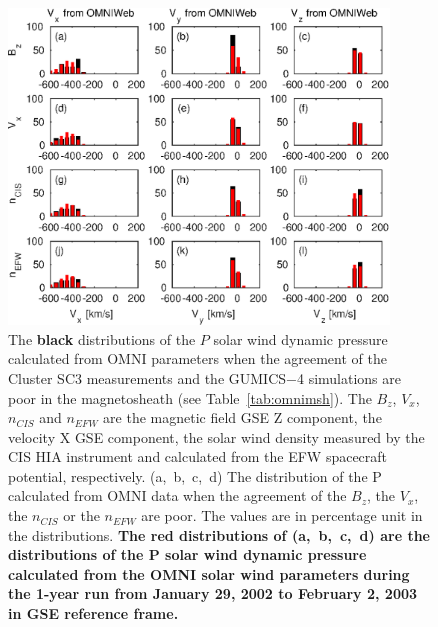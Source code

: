 \documentclass[linenumbers,draft]{agujournal}
\begin{document}
\begin{figure}[h]
\centering
\includegraphics[width=0.9\textwidth,angle=0]{swe-2021-corr-f18}
\caption{The \textbf{black} distributions of the $P$ solar wind dynamic pressure calculated from OMNI parameters when the agreement of the Cluster SC3 measurements and the GUMICS$-$4 simulations are poor in the magnetosheath (see Table~\ref{tab:omnimsh}). The $B_{z}$, $V_{x}$, $n_{CIS}$ and $n_{EFW}$ are the magnetic field GSE Z component, the velocity X GSE component, the solar wind density measured by the CIS HIA instrument and calculated from the EFW spacecraft potential, respectively. (a,~b,~c,~d) The distribution of the P calculated from OMNI data when the agreement of the $B_{z}$, the $V_{x}$, the $n_{CIS}$ or the $n_{EFW}$ are poor. The values are in percentage unit in the distributions. \textbf{The red distributions of (a,~b,~c,~d) are the distributions of the P solar wind dynamic pressure calculated from the OMNI solar wind parameters during the 1-year run from January 29, 2002 to February 2, 2003 in GSE reference frame.}}
\label{fig:mshomnip}
\end{figure}

\pagebreak
\end{document}

